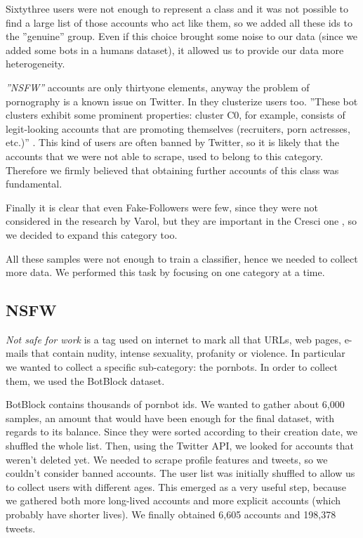 Sixtythree users were not enough to represent a class and it was not possible to find a large list of those accounts who act like them, so we added all these ids to the ''genuine'' group. Even if this choice brought some noise to our data (since we added some bots in a humans dataset), it allowed us to provide our data more heterogeneity.

\emph{''NSFW''} accounts are only thirtyone elements, anyway the problem of pornography is a known issue on Twitter. In \cite{Varol} they clusterize users too. ''These bot clusters exhibit some prominent properties: cluster C0, for example, consists of legit-looking accounts that are promoting themselves (recruiters, porn actresses, etc.)'' \cite{Varol}.
This kind of users are often banned by Twitter, so it is likely that the accounts that we were not able to scrape, used to belong to this category.
Therefore we firmly believed that obtaining further accounts of this class was fundamental.

Finally it is clear that even Fake-Followers were few, since they were not considered in the research by Varol, but they are important in the Cresci one \cite{Cresci}, so we decided to expand this category too.

All these samples were not enough to train a classifier, hence we needed to collect more data. We performed this task by focusing on one category at a time.

\subsection{NSFW}
\emph{Not safe for work} is a tag used on internet to mark all that URLs, web pages, e-mails that contain nudity, intense sexuality, profanity or violence. In particular we wanted to collect a specific sub-category: the pornbots. In order to collect them, we used the BotBlock dataset.

BotBlock contains thousands of pornbot ids. We wanted to gather about 6,000 samples, an amount that would have been enough for the final dataset, with regards to its balance.
Since they were sorted according to their creation date, we shuffled the whole list. Then, using the Twitter API, we looked for accounts that weren't deleted yet. 
We needed to scrape profile features and tweets, so we couldn't consider banned accounts. The user list was initially shuffled to allow us to collect users with different ages. This emerged as a very useful step, because we gathered both more long-lived accounts and more explicit accounts (which probably have shorter lives). We finally obtained 6,605 accounts and 198,378 tweets.

